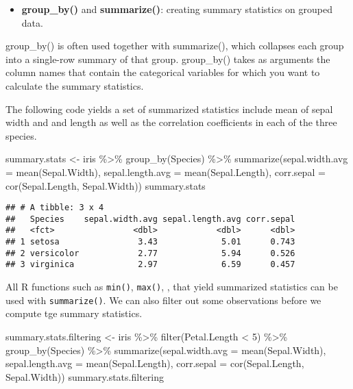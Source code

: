 \documentclass[
]{article}
\newenvironment{Shaded}{\begin{snugshade}}{\end{snugshade}}
\newcommand{\AttributeTok}[1]{\textcolor[rgb]{0.77,0.63,0.00}{#1}}
\newcommand{\DecValTok}[1]{\textcolor[rgb]{0.00,0.00,0.81}{#1}}
\newcommand{\FunctionTok}[1]{\textcolor[rgb]{0.00,0.00,0.00}{#1}}
\newcommand{\NormalTok}[1]{#1}
\newcommand{\OtherTok}[1]{\textcolor[rgb]{0.56,0.35,0.01}{#1}}
\newcommand{\SpecialCharTok}[1]{\textcolor[rgb]{0.00,0.00,0.00}{#1}}
\providecommand{\tightlist}{%
  \setlength{\itemsep}{0pt}\setlength{\parskip}{0pt}}
\begin{document}
\begin{itemize}
\tightlist
\item
  \textbf{group\_by()} and \textbf{summarize()}: creating summary
  statistics on grouped data.
\end{itemize}

group\_by() is often used together with summarize(), which collapses
each group into a single-row summary of that group. group\_by() takes as
arguments the column names that contain the categorical variables for
which you want to calculate the summary statistics.

The following code yields a set of summarized statistics include mean of
sepal width and and length as well as the correlation coefficients in
each of the three species.

\begin{Shaded}
\begin{Highlighting}[]
\NormalTok{summary.stats }\OtherTok{\textless{}{-}}\NormalTok{ iris }\SpecialCharTok{\%\textgreater{}\%}
             \FunctionTok{group\_by}\NormalTok{(Species) }\SpecialCharTok{\%\textgreater{}\%}
             \FunctionTok{summarize}\NormalTok{(}\AttributeTok{sepal.width.avg =} \FunctionTok{mean}\NormalTok{(Sepal.Width),}
                       \AttributeTok{sepal.length.avg =} \FunctionTok{mean}\NormalTok{(Sepal.Length),}
                       \AttributeTok{corr.sepal =} \FunctionTok{cor}\NormalTok{(Sepal.Length, Sepal.Width)) }
\NormalTok{summary.stats}
\end{Highlighting}
\end{Shaded}

\begin{verbatim}
## # A tibble: 3 x 4
##   Species    sepal.width.avg sepal.length.avg corr.sepal
##   <fct>                <dbl>            <dbl>      <dbl>
## 1 setosa                3.43             5.01      0.743
## 2 versicolor            2.77             5.94      0.526
## 3 virginica             2.97             6.59      0.457
\end{verbatim}

All R functions such as \texttt{min()}, \texttt{max()}, , that yield
summarized statistics can be used with \texttt{summarize()}. We can also
filter out some observations before we compute tge summary statistics.

\begin{Shaded}
\begin{Highlighting}[]
\NormalTok{summary.stats.filtering }\OtherTok{\textless{}{-}}\NormalTok{ iris }\SpecialCharTok{\%\textgreater{}\%}
             \FunctionTok{filter}\NormalTok{(Petal.Length }\SpecialCharTok{\textless{}} \DecValTok{5}\NormalTok{) }\SpecialCharTok{\%\textgreater{}\%}
             \FunctionTok{group\_by}\NormalTok{(Species) }\SpecialCharTok{\%\textgreater{}\%}
             \FunctionTok{summarize}\NormalTok{(}\AttributeTok{sepal.width.avg =} \FunctionTok{mean}\NormalTok{(Sepal.Width),}
                       \AttributeTok{sepal.length.avg =} \FunctionTok{mean}\NormalTok{(Sepal.Length),}
                       \AttributeTok{corr.sepal =} \FunctionTok{cor}\NormalTok{(Sepal.Length, Sepal.Width)) }
\NormalTok{summary.stats.filtering}
\end{Highlighting}
\end{Shaded}
\end{document}
